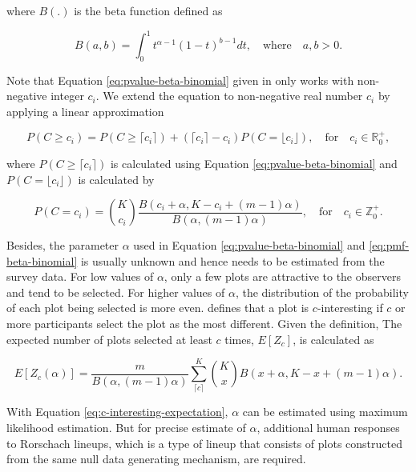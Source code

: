 \documentclass[]{interact}
\theoremstyle{plain}%
\theoremstyle{definition}
\theoremstyle{remark}
\begin{document}
\noindent where \(B(.)\) is the beta function defined as

\begin{equation} \label{eq:betafunction}
B(a, b) = \int_{0}^{1}t^{\alpha - 1}(1-t)^{b-1}dt,\quad \text{where}\quad a,b>0.
\end{equation}

Note that Equation \ref{eq:pvalue-beta-binomial} given in
\citet{vanderplas2021statistical} only works with non-negative integer
\(c_i\). We extend the equation to non-negative real number \(c_i\) by
applying a linear approximation

\begin{equation} \label{eq:pvalue-beta-binomial-approx}
P(C \geq c_i) = P(C \geq \lceil c_i \rceil) + (\lceil c_i \rceil - c_i) P(C = \lfloor c_i \rfloor), \quad \text{for}\quad c_i \in \mathbb{R}_0^+,
\end{equation}

where \(P(C \geq \lceil c_i \rceil)\) is calculated using Equation
\ref{eq:pvalue-beta-binomial} and \(P(C = \lfloor c_i \rfloor)\) is
calculated by

\begin{equation} \label{eq:pmf-beta-binomial}
P(C = c_i) = {K \choose c_i}\frac{B(c_i + \alpha, K - c_i + (m - 1)\alpha)}{B(\alpha, (m-1)\alpha)},\quad \text{for} \quad c_i \in \mathbb{Z}_0^+.
\end{equation}

Besides, the parameter \(\alpha\) used in Equation
\ref{eq:pvalue-beta-binomial} and \ref{eq:pmf-beta-binomial} is usually
unknown and hence needs to be estimated from the survey data. For low
values of \(\alpha\), only a few plots are attractive to the observers
and tend to be selected. For higher values of \(\alpha\), the
distribution of the probability of each plot being selected is more
even. \citet{vanderplas2021statistical} defines that a plot is
\(c\)-interesting if \(c\) or more participants select the plot as the
most different. Given the definition, The expected number of plots
selected at least \(c\) times, \(E[Z_c]\), is calculated as

\begin{equation} \label{eq:c-interesting-expectation}
E[Z_c(\alpha)] = \frac{m}{B(\alpha, (m-1)\alpha)}\sum_{\lceil c \rceil}^{K}{K \choose x} B(x + \alpha, K - x + (m-1)\alpha).\end{equation}

With Equation \ref{eq:c-interesting-expectation}, \(\alpha\) can be
estimated using maximum likelihood estimation. But for precise estimate
of \(\alpha\), additional human responses to Rorschach lineups, which is
a type of lineup that consists of plots constructed from the same null
data generating mechanism, are required.
\end{document}

